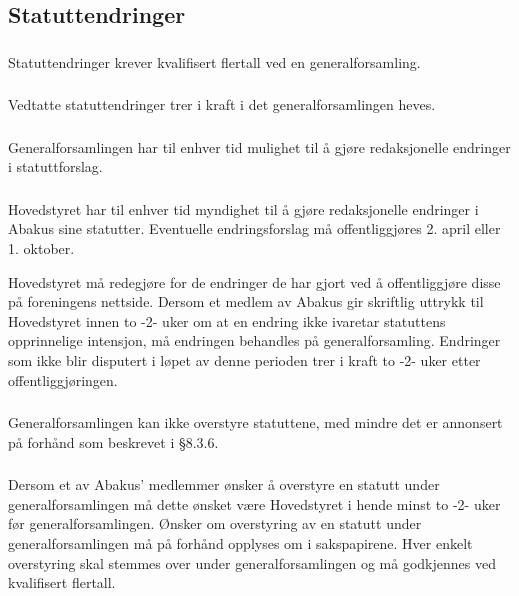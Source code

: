 \subsection{Statuttendringer}
\subsubsection{}
Statuttendringer krever kvalifisert flertall ved en generalforsamling.

\subsubsection{}
Vedtatte statuttendringer trer i kraft i det generalforsamlingen heves.

\subsubsection{}
Generalforsamlingen har til enhver tid mulighet til å gjøre redaksjonelle endringer i
statuttforslag.

\subsubsection{}
Hovedstyret har til enhver tid myndighet til å gjøre redaksjonelle endringer i
Abakus sine statutter. Eventuelle endringsforslag må offentliggjøres 2. april eller 1. oktober.

Hovedstyret må redegjøre for de endringer de har gjort ved å offentliggjøre
disse på foreningens nettside. Dersom et medlem av Abakus gir skriftlig uttrykk
til Hovedstyret innen to -2- uker om at en endring ikke ivaretar statuttens
opprinnelige intensjon, må endringen behandles på generalforsamling. Endringer
som ikke blir disputert i løpet av denne perioden trer i kraft to -2- uker
etter offentliggjøringen.

\subsubsection{}
Generalforsamlingen kan ikke overstyre statuttene, med mindre det er annonsert på forhånd som beskrevet i §8.3.6.

\subsubsection{}
Dersom et av Abakus' medlemmer ønsker å overstyre en statutt under
generalforsamlingen må dette ønsket være Hovedstyret i hende minst to -2- uker
før generalforsamlingen. Ønsker om overstyring av en statutt under
generalforsamlingen må på forhånd opplyses om i sakspapirene. Hver enkelt
overstyring skal stemmes over under generalforsamlingen og må godkjennes ved
kvalifisert flertall.

